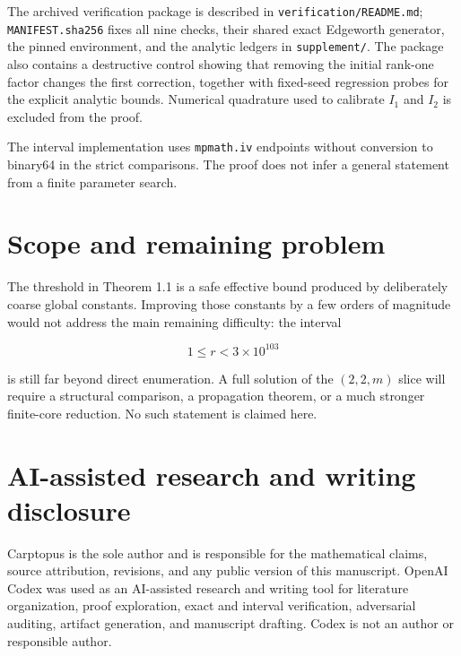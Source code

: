 \documentclass[11pt]{article}
\begin{document}
The archived verification package is described in \texttt{verification/README.md}; \texttt{MANIFEST.sha256} fixes all nine checks, their shared exact Edgeworth generator, the pinned environment, and the analytic ledgers in \texttt{supplement/}.  The package also contains a destructive control showing that removing the initial rank-one factor changes the first correction, together with fixed-seed regression probes for the explicit analytic bounds.  Numerical quadrature used to calibrate $I_1$ and $I_2$ is excluded from the proof.

The interval implementation uses \texttt{mpmath.iv} endpoints without conversion to binary64 in the strict comparisons.  The proof does not infer a general statement from a finite parameter search.

\section{Scope and remaining problem}

The threshold in Theorem 1.1 is a safe effective bound produced by deliberately coarse global constants.  Improving those constants by a few orders of magnitude would not address the main remaining difficulty: the interval

\[
1\le r<3\times10^{103}
\]

is still far beyond direct enumeration.  A full solution of the $(2,2,m)$ slice will require a structural comparison, a propagation theorem, or a much stronger finite-core reduction.  No such statement is claimed here.

\section*{AI-assisted research and writing disclosure}
Carptopus is the sole author and is responsible for the mathematical claims, source attribution, revisions, and any public version of this manuscript. OpenAI Codex was used as an AI-assisted research and writing tool for literature organization, proof exploration, exact and interval verification, adversarial auditing, artifact generation, and manuscript drafting. Codex is not an author or responsible author.
\end{document}

